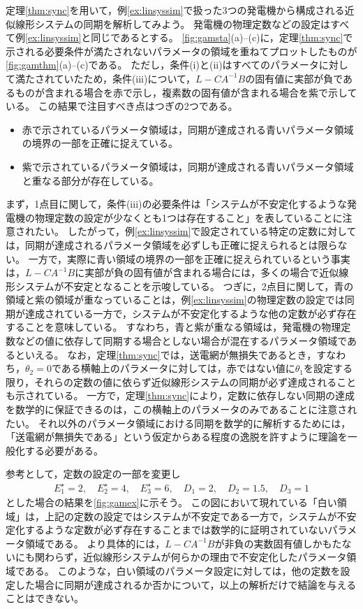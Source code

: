 \documentclass[tombow,dvipdfmx]{corona-a5}
\begin{document}
\begin{例}[正実性や特異摂動近似に基づく近似線形システムの同期解析]\label{ex:linthm}
定理\ref{thm:sync}を用いて，例\ref{ex:linsyssim}で扱った3つの発電機から構成される近似線形システムの同期を解析してみよう。
発電機の物理定数などの設定はすべて例\ref{ex:linsyssim}と同じであるとする。
\ref{fig:gamsta}(a)--(c)に，定理\ref{thm:sync}で示される必要条件が満たされないパラメータの領域を重ねてプロットしたものが\ref{fig:gamthm}(a)--(c)である。
ただし，条件(i)と(ii)はすべてのパラメータに対して満たされていたため，条件(iii)について，$L-CA^{-1}B$の固有値に実部が負であるものが含まれる場合を赤で示し，複素数の固有値が含まれる場合を紫で示している。
この結果で注目すべき点はつぎの2つである。
\begin{itemize}
\item 赤で示されているパラメータ領域は，同期が達成される青いパラメータ領域の境界の一部を正確に捉えている。
\item 紫で示されているパラメータ領域は，同期が達成される青いパラメータ領域と重なる部分が存在している。
\end{itemize}
まず，1点目に関して，条件(iii)の必要条件は「システムが不安定化するような発電機の物理定数の設定が少なくとも1つは存在すること」を表していることに注意されたい。
したがって，例\ref{ex:linsyssim}で設定されている特定の定数に対しては，同期が達成されるパラメータ領域を必ずしも正確に捉えられるとは限らない。
一方で，実際に青い領域の境界の一部を正確に捉えられているという事実は，$L-CA^{-1}B$に実部が負の固有値が含まれる場合には，多くの場合で近似線形システムが不安定となることを示唆している。
つぎに，2点目に関して，青の領域と紫の領域が重なっていることは，例\ref{ex:linsyssim}の物理定数の設定では同期が達成されている一方で，システムが不安定化するような他の定数が必ず存在することを意味している。
すなわち，青と紫が重なる領域は，発電機の物理定数などの値に依存して同期する場合としない場合が混在するパラメータ領域であるといえる。
なお，定理\ref{thm:sync}では，送電網が無損失であるとき，すなわち，$\theta_2=0$である横軸上のパラメータに対しては，赤ではない値に$\theta_1$を設定する限り，それらの定数の値に依らず近似線形システムの同期が必ず達成されることも示されている。
一方で，定理\ref{thm:sync}により，定数に依存しない同期の達成を数学的に保証できるのは，この横軸上のパラメータのみであることに注意されたい。
それ以外のパラメータ領域における同期を数学的に解析するためには，「送電網が無損失である」という仮定からある程度の逸脱を許すように理論を一般化する必要がある。

参考として，定数の設定の一部を変更し
\begin{align*}
E_1^{\star}=2
,\quad
E_2^{\star}=4
,\quad
E_3^{\star}=6
,\quad
D_1 = 2
,\quad
D_2 = 1.5
,\quad
D_3 = 1
\end{align*}
とした場合の結果を\ref{fig:gamex}に示そう。
この図において現れている「白い領域」は，上記の定数の設定ではシステムが不安定である一方で，システムが不安定化するような定数が必ず存在することまでは数学的に証明されていないパラメータ領域である。
より具体的には，$L-CA^{-1}B$が非負の実数固有値しかもたないにも関わらず，近似線形システムが何らかの理由で不安定化したパラメータ領域である。
このような，白い領域のパラメータ設定に対しては，他の定数を設定した場合に同期が達成されるか否かについて，以上の解析だけで結論を与えることはできない。
\end{例}
\end{document}
